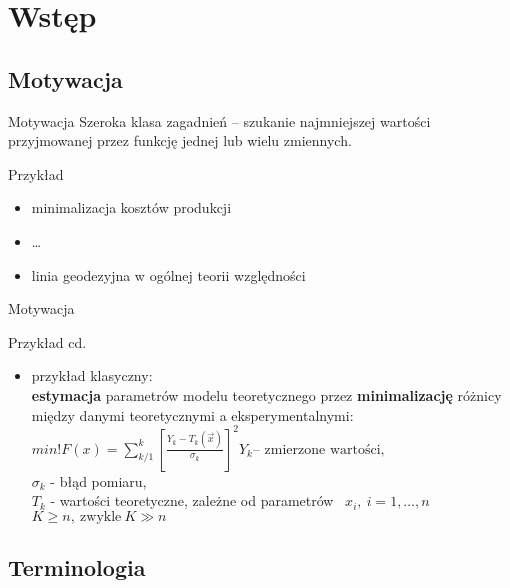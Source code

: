 \section{Wstęp}

\subsection{Motywacja}

  \begin{frame}{Motywacja}
    Szeroka klasa zagadnień -- szukanie najmniejszej wartości
    przyjmowanej przez funkcję jednej lub wielu zmiennych.

    \begin{exampleblock}{Przykład}
      \begin{itemize}
        \item minimalizacja kosztów produkcji
        \item \ldots
        \item linia geodezyjna w ogólnej teorii względności
      \end{itemize}
    \end{exampleblock}
  \end{frame}

  \begin{frame}{Motywacja}
    \begin{exampleblock}{Przykład cd.}
      \begin{itemize}
        \item przykład klasyczny:\\
        \textbf{estymacja} parametrów modelu teoretycznego
        przez \textbf{minimalizację} różnicy między danymi
        teoretycznymi a eksperymentalnymi:\\
        $
          min!F(x) = \sum_{k/1}^{k} \left[ \frac{Y_k - T_k(\vec x)}{\sigma_k}
          \right] ^2 Y_k \text{-- zmierzone wartości,}
        $ \\
        $ \sigma_k $ - błąd pomiaru,\\
        $ T_k $ - wartości teoretyczne, zależne od parametrów~
        $ x_i{,}\ i=1{,} \dots {,}n $ \\
        $ K \geq n{,}\ \text{zwykle}\ K \gg n $
      \end{itemize}
    \end{exampleblock}
  \end{frame}

\subsection{Terminologia}

